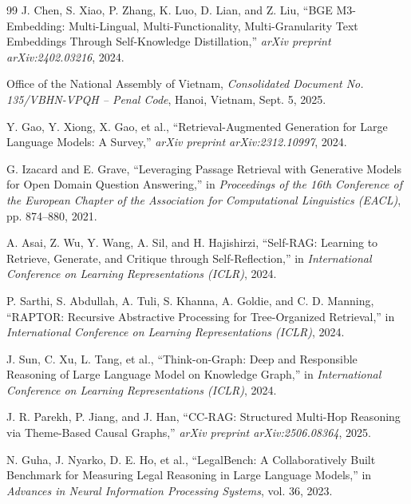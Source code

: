 \begin{thebibliography}{99}
J. Chen, S. Xiao, P. Zhang, K. Luo, D. Lian, and Z. Liu,
``BGE M3-Embedding: Multi-Lingual, Multi-Functionality,
Multi-Granularity Text Embeddings Through Self-Knowledge Distillation,''
\textit{arXiv preprint arXiv:2402.03216}, 2024.

Office of the National Assembly of Vietnam,
\textit{Consolidated Document No. 135/VBHN-VPQH -- Penal Code},
Hanoi, Vietnam, Sept. 5, 2025.


Y. Gao, Y. Xiong, X. Gao, et al.,
``Retrieval-Augmented Generation for Large Language Models: A Survey,''
\textit{arXiv preprint arXiv:2312.10997}, 2024.

G. Izacard and E. Grave,
``Leveraging Passage Retrieval with Generative Models for Open Domain
Question Answering,''
in \textit{Proceedings of the 16th Conference of the European Chapter of the
Association for Computational Linguistics (EACL)},
pp. 874--880, 2021.

A. Asai, Z. Wu, Y. Wang, A. Sil, and H. Hajishirzi,
``Self-RAG: Learning to Retrieve, Generate, and Critique through
Self-Reflection,''
in \textit{International Conference on Learning Representations (ICLR)}, 2024.

P. Sarthi, S. Abdullah, A. Tuli, S. Khanna, A. Goldie, and C. D. Manning,
``RAPTOR: Recursive Abstractive Processing for Tree-Organized Retrieval,''
in \textit{International Conference on Learning Representations (ICLR)}, 2024.

J. Sun, C. Xu, L. Tang, et al.,
``Think-on-Graph: Deep and Responsible Reasoning of Large Language Model on
Knowledge Graph,''
in \textit{International Conference on Learning Representations (ICLR)}, 2024.

J. R. Parekh, P. Jiang, and J. Han,
``CC-RAG: Structured Multi-Hop Reasoning via Theme-Based Causal Graphs,''
\textit{arXiv preprint arXiv:2506.08364}, 2025.

N. Guha, J. Nyarko, D. E. Ho, et al.,
``LegalBench: A Collaboratively Built Benchmark for Measuring Legal Reasoning
in Large Language Models,''
in \textit{Advances in Neural Information Processing Systems},
vol. 36, 2023.


\end{thebibliography}
